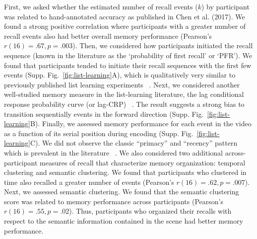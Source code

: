 \documentclass{article}
\begin{document}
First, we asked whether the estimated number of recall events ($k$) by participant was related to hand-annotated accuracy as published in Chen et al. (2017).  We found a strong positive correlation where participants with a greater number of recall events also had better overall memory performance (Pearson's $r(16)=.67, p=.003$). Then, we considered how participants initiated the recall sequence (known in the literature as the `probability of first recall' or `PFR'). We found that participants tended to initiate their recall sequences with the first few events (Supp. Fig.~\ref{fig:list-learning}A), which is qualitatively very similar to previously published list learning experiments ~\citep{HowaKaha99}. Next, we considered another well-studied memory measure in the list-learning literature, the lag conditional response probability curve (or lag-CRP) ~\citep{Kaha96}. The result suggests a strong bias to transition sequentially events in the forward direction (Supp. Fig.~\ref{fig:list-learning}B). Finally, we assessed memory performance for each event in the video as a function of its serial position during encoding (Supp. Fig.~\ref{fig:list-learning}C). We did not observe the classic ``primacy'' and ``recency'' pattern which is prevalent in the literature ~\citep{Murd62a}. We also considered two additional across-participant measures of recall that characterize memory organization: temporal clustering and semantic clustering. We found that participants who clustered in time also recalled a greater number of events (Pearson's $r(16)=.62, p=.007$). Next, we assessed semantic clustering. We found that the semantic clustering score was related to memory performance across participants (Pearson's $r(16)=.55, p=.02$).  Thus, participants who organized their recalls with respect to the semantic information contained in the scene had better memory performance.
\end{document}
